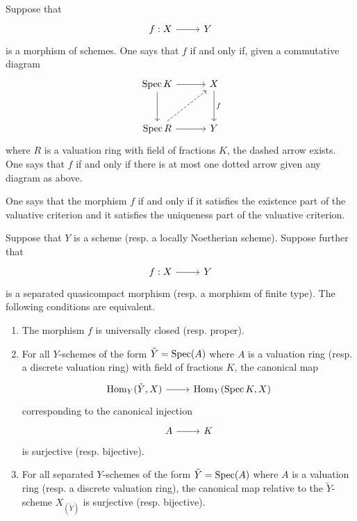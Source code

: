 \documentclass [11 pt, oneside] {article}
\begin{document}
\begin{definition}\label{}\text{}
Suppose that 
\[
\begin{tikzcd}
f:X\ar[r]&Y
\end{tikzcd}
\]  is a morphism of schemes. One says that $f$  if and only if, given a commutative diagram
\[
\begin{tikzcd}[row sep = 3 em, column sep = 3 em]
	\Spec K \ar[r]\ar[d] &X\ar[d, "f"]\\ \Spec R \ar[r]\ar[ur,dashed] & Y
\end{tikzcd}
\]
where $R$ is a valuation ring with field of fractions $K$, the dashed arrow exists. One says that $f$  if and only if there is at most one dotted arrow given any diagram as above.

One says that the morphism $f$  if and only if it satisfies the existence part of the valuative criterion and it satisfies the uniqueness part of the valuative criterion.
\end{definition}

\begin{theorem}\label{}\index{}\text{}
Suppose that $Y$ is a scheme (resp. a locally Noetherian scheme). Suppose further that 
\[
\begin{tikzcd}
f:X\ar[r]&Y
\end{tikzcd}
\] 
 is a separated quasicompact morphism (resp. a morphism of finite type). The following conditions are equivalent.
 \begin{enumerate}
	\item The morphism $f$ is universally closed (resp. proper).
	\item For all $Y$-schemes of the form $\tilde Y = \operatorname{Spec} (A)$ where $A$ is a valuation ring (resp. a discrete valuation ring) with field of fractions $K$, the canonical map
		\[
\begin{tikzcd}
\Hom_{Y}(\tilde Y, X)\ar[r]& \Hom_{Y}(\Spec K, X)
\end{tikzcd}
\] 
		corresponding to the canonical injection
		\[
\begin{tikzcd}
A\ar[r]&K
\end{tikzcd}
\] 
is surjective (resp. bijective).
	\item For all separated $Y$-schemes of the form $\tilde Y = \operatorname{Spec} (A)$ where $A$ is a valuation ring (resp. a discrete valuation ring), the canonical map relative to the $\tilde Y$-scheme $X_{(\tilde Y) }$ is surjective (resp. bijective).
\end{enumerate}
\end{theorem}
\end{document}
